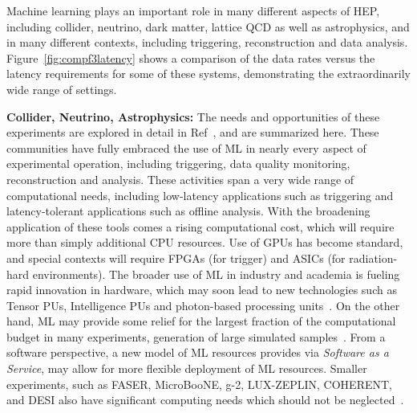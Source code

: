 \documentclass[submission,Phys]{SciPost}
\begin{document}
Machine learning plays an important role in many different aspects of HEP, including collider, neutrino, dark matter, lattice QCD as well as astrophysics, and in many different contexts, including triggering, reconstruction and data analysis.  Figure~\ref{fig:compf3latency} shows a comparison of the data rates versus the latency requirements for some of these systems, demonstrating the extraordinarily wide range of settings.

{\bf  Collider, Neutrino, Astrophysics:} The needs and opportunities of these experiments are explored in detail in Ref~\cite{Harris:2022qtm}, and are summarized here. These communities have fully embraced the use of ML in nearly every aspect of experimental operation, including triggering, data quality monitoring, reconstruction and analysis. These activities span a very wide range of computational needs, including low-latency applications such as triggering and latency-tolerant applications such as offline analysis. With the broadening application of these tools comes a rising computational cost, which will require more than simply additional CPU resources. Use of GPUs has become standard, and special contexts will require FPGAs (for trigger) and ASICs (for radiation-hard environments). The broader use of ML in industry and academia is fueling rapid innovation in hardware, which may soon lead to new technologies such as Tensor PUs, Intelligence PUs and photon-based processing units~\cite{Harris:2022qtm}.  On the other hand, ML may provide some relief for the largest fraction of the computational budget in many experiments, generation of large simulated samples~\cite{HEPSoftwareFoundation:2020daq}.  From a software perspective, a new model of ML resources provides via {\it Software as a Service}, may allow for more flexible deployment of ML resources. Smaller experiments, such as FASER, MicroBooNE, g-2, LUX-ZEPLIN, COHERENT, and DESI also have significant computing needs which should not be neglected~\cite{Andreopoulos:2022iai}.
\end{document}
